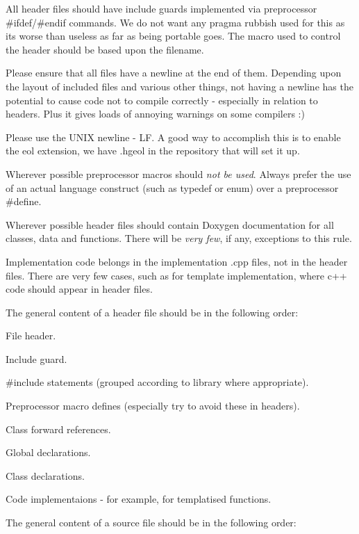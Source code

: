 \begin{DoxyItemize}
\item All header files should have include guards implemented via preprocessor {\ttfamily \#ifdef/\#endif} commands. We do not want any pragma rubbish used for this as it\textquotesingle{}s worse than useless as far as being portable goes. The macro used to control the header should be based upon the filename.
\item Please ensure that all files have a newline at the end of them. Depending upon the layout of included files and various other things, not having a newline has the potential to cause code not to compile correctly -\/ especially in relation to headers. Plus it gives loads of annoying warnings on some compilers \+:)
\item Please use the U\+N\+IX newline -\/ LF. A good way to accomplish this is to enable the eol extension, we have .hgeol in the repository that will set it up.
\item Wherever possible preprocessor macros should {\itshape not be used}. Always prefer the use of an actual language construct (such as typedef or enum) over a preprocessor {\ttfamily \#define}.
\item Wherever possible header files should contain Doxygen documentation for all classes, data and functions. There will be {\itshape very few}, if any, exceptions to this rule.
\item Implementation code belongs in the implementation .cpp files, not in the header files. There are very few cases, such as for template implementation, where c++ code should appear in header files.
\item The general content of a header file should be in the following order\+:
\begin{DoxyItemize}
\item File header.
\item Include guard.
\item \#include statements (grouped according to library where appropriate).
\item Preprocessor macro defines (especially try to avoid these in headers).
\item Class forward references.
\item Global declarations.
\item Class declarations.
\item Code implementaions -\/ for example, for templatised functions.
\end{DoxyItemize}
\item The general content of a source file should be in the following order\+:

\end{DoxyItemize}
